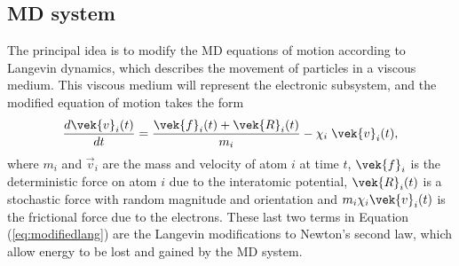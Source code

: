 \subsection*{MD system}

The principal idea is to modify the MD equations of motion 
according to Langevin 
dynamics, 
which describes the movement of particles in a viscous medium. 
This viscous medium will represent the electronic subsystem, and the 
modified equation of motion takes the form
\begin{equation} \label{eq:modifiedlang}
{d \vek{v}_{i}(t) \over d t} = {{\vek{f}_{i}(t)+\vek{R}_{i}(t)} \over
m_{i}} - \chi_{i} \; \vek{v}_{i}(t),
\end{equation}
where $m_i$ and $\vec{v}_i$ are the mass and velocity of atom $i$ 
at time $t$, $\vek{f}_{i}$ is the deterministic force on atom $i$ due 
to the interatomic potential, $\vek{R}_{i}(t)$ is a stochastic force with 
random magnitude and orientation and $m_{i} \chi_{i} \vek{v}_{i}(t)$ 
is the frictional force due to the electrons. These last two terms in 
Equation (\ref{eq:modifiedlang}) are the Langevin modifications to 
Newton's second law, which allow energy to be lost and gained by 
the MD system. 

